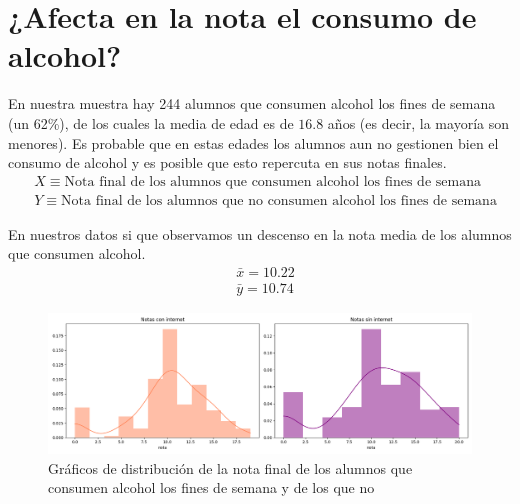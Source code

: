\section{¿Afecta en la nota el consumo de alcohol?}

En nuestra muestra hay 244 alumnos que consumen alcohol los fines de semana (un 62\%), de los cuales la media de edad es de $16.8$ años (es decir, la mayoría son menores). Es probable que en estas edades los alumnos aun no gestionen bien el consumo de alcohol y es posible que esto repercuta en sus notas finales.
\begin{equation*}
    \begin{split}
        & X \equiv \text{Nota final de los alumnos que consumen alcohol los fines de semana}\\
        & Y \equiv \text{Nota final de los alumnos que no consumen alcohol los fines de semana}
    \end{split}
\end{equation*}

En nuestros datos si que observamos un descenso en la nota media de los alumnos que consumen alcohol.
\begin{equation*}
    \begin{split}
        & \bar{x} = 10.22\\
        & \bar{y} = 10.74
    \end{split}
\end{equation*}

\begin{figure}[H]
    \begin{center}
        \includegraphics[width=1\textwidth]{figures/dist-notas-walc.png}
    \end{center}
    \caption{Gráficos de distribución de la nota final de los alumnos que consumen alcohol los fines de semana y de los que no}\label{fig:dist-notas-walc}
\end{figure}

